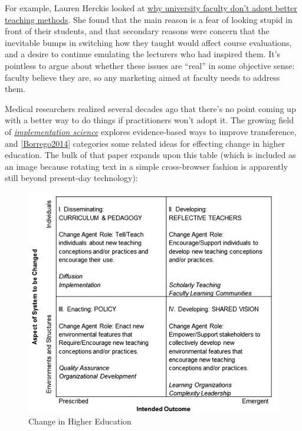\documentclass[10pt,statementpaper]{memoir}
\begin{document}
For example, Lauren Herckis looked at
\href{https://www.insidehighered.com/news/2017/07/06/anthropologist-studies-why-professors-dont-adopt-innovative-teaching-methods}{why
university faculty don't adopt better teaching methods}. She found that
the main reason is a fear of looking stupid in front of their students,
and that secondary reasons were concern that the inevitable bumps in
switching how they taught would affect course evaluations, and a desire
to continue emulating the lecturers who had inspired them. It's
pointless to argue about whether these issues are ``real'' in some
objective sense: faculty believe they are, so any marketing aimed at
faculty needs to address them.

Medical researchers realized several decades ago that there's no point
coming up with a better way to do things if practitioners won't adopt
it. The growing field of
\emph{\href{gloss.html\#implementation-science}{implementation science}}
explores evidence-based ways to improve transference, and
{[}\href{biblio.html\#borrego-henderson-change}{Borrego2014}{]}
categories some related ideas for effecting change in higher education.
The bulk of that paper expands upon this table (which is included as an
image because rotating text in a simple cross-browser fashion is
apparently still beyond present-day technology):

\begin{figure}
\centering
\includegraphics{fig/borrega-henderson-table.png}
\caption{Change in Higher Education}
\end{figure}
\end{document}
